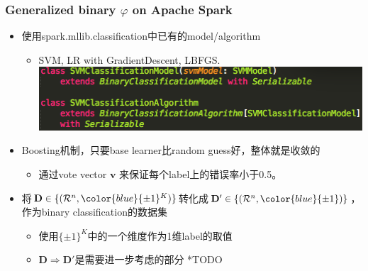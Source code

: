 \documentclass{beamer}
\DeclareMathOperator*{\argmin}{arg\,min}
\begin{document}
%

\begin{frame}
\frametitle{Generalized binary $\varphi$ on Apache Spark}
\begin{itemize}
\item 使用spark.mllib.classification中已有的model/algorithm
\begin{itemize}
  \item SVM, LR with GradientDescent, LBFGS.
\includegraphics[scale=0.5]{img/svm_bin.png}
\end{itemize}
\item Boosting机制，只要base learner比random guess好，整体就是收敛的
  \begin{itemize}
    \item 通过vote vector $\mathbf{v}$ 来保证每个label上的错误率小于0.5。
  \end{itemize}
\item 将$\mathbf{D} \in \{(\mathcal{R}^n, {\color{blue} \{\pm1\}^K } )\}$转化成$\mathbf{D}' \in \{(\mathcal{R}^n, { \color{blue} \{\pm1\} } )\}$，作为binary classification的数据集
  \begin{itemize}
    \item 使用$\{\pm1\}^K$中的一个维度作为1维label的取值
    \item $\mathbf{D} \Rightarrow \mathbf{D}'$是需要进一步考虑的部分 *TODO
  \end{itemize}
\end{itemize}
\end{frame}
\end{document}

